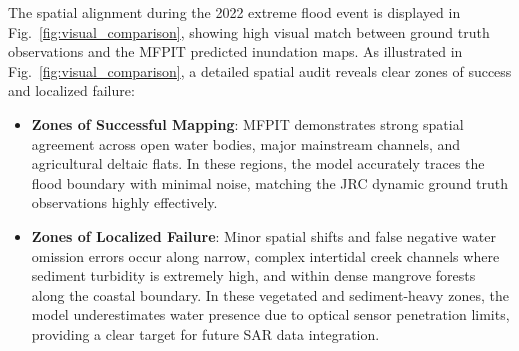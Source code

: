 \documentclass[journal]{IEEEtran}
\begin{document}
\begin{table}[!t]
\caption{Verified Year-by-Year Evaluation Across the 2020--2023 Hydrological Epochs ($n = 98$ Patches per Year)}
\label{tab:extreme_events}
\centering
{}
\end{table}

The spatial alignment during the 2022 extreme flood event is displayed in Fig.~\ref{fig:visual_comparison}, showing high visual match between ground truth observations and the MFPIT predicted inundation maps. As illustrated in Fig.~\ref{fig:visual_comparison}, a detailed spatial audit reveals clear zones of success and localized failure:
\begin{itemize}
    \item \textbf{Zones of Successful Mapping}: MFPIT demonstrates strong spatial agreement across open water bodies, major mainstream channels, and agricultural deltaic flats. In these regions, the model accurately traces the flood boundary with minimal noise, matching the JRC dynamic ground truth observations highly effectively.
    \item \textbf{Zones of Localized Failure}: Minor spatial shifts and false negative water omission errors occur along narrow, complex intertidal creek channels where sediment turbidity is extremely high, and within dense mangrove forests along the coastal boundary. In these vegetated and sediment-heavy zones, the model underestimates water presence due to optical sensor penetration limits, providing a clear target for future SAR data integration.
\end{itemize}
\end{document}
